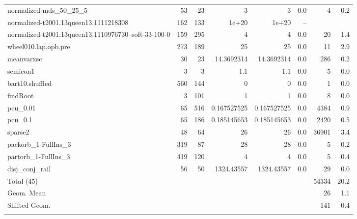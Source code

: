 \documentclass[leqno]{article}
\begin{document}
\begin{center}
\begin{supertabular*}{\textwidth}{@{\extracolsep{\fill}}lrrrrrrr@{}}
normalized-mds\_50\_25\_5 &     53 &     23 &                3 &                3 &    0.0 &         4 &      0.2\\
normalized-t2001.13queen13.1111218308 &    162 &    133 &            1e+20 &            1e+20 &   --   & &\\
normalized-t2001.13queen13.1110976730--soft-33-100-0 &    159 &    295 &                4 &                4 &    0.0 &        20 &      1.4\\
wheel010.lap.opb.pre &    273 &    189 &               25 &               25 &    0.0 &        11 &      2.9\\
meanvarxsc         &     30 &     23 &       14.3692314 &       14.3692314 &    0.0 &       286 &      0.2\\
semicon1           &      3 &      3 &              1.1 &              1.1 &    0.0 &         5 &      0.0\\
bart10.shuffled    &    560 &    144 &                0 &                0 &    0.0 &         1 &      0.0\\
findRoot           &      3 &    101 &                1 &                1 &    0.0 &         8 &      0.0\\
pcu\_0.01          &     65 &    516 &      0.167527525 &      0.167527525 &    0.0 &      4384 &      0.9\\
pcu\_0.1           &     65 &    186 &      0.185145653 &      0.185145653 &    0.0 &      2420 &      0.5\\
sparse2            &     48 &     64 &               26 &               26 &    0.0 &     36901 &      3.4\\
packorb\_1-FullIns\_3 &    319 &     87 &               28 &               28 &    0.0 &         5 &      0.2\\
partorb\_1-FullIns\_3 &    419 &    120 &                4 &                4 &    0.0 &         5 &      0.4\\
disj\_conj\_rail   &     56 &     50 &       1324.43557 &       1324.43557 &    0.0 &        29 &      0.0\\
\midrule
Total          (45) &        &        &                &                &        &     54334 &     20.2\\
Geom. Mean          &        &        &                &                &        &        26 &      1.1\\
Shifted Geom.       &        &        &                &                &        &       141 &      0.4 \\
\noalign{\vspace{6pt}}
\end{supertabular*}
\end{center}
\end{document}
